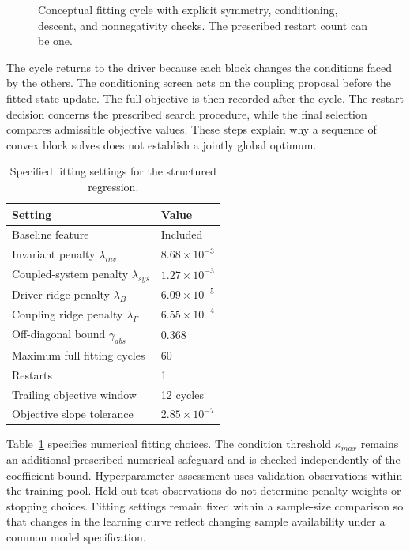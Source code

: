 \begin{figure}[htbp]
\centering

\caption{Conceptual fitting cycle with explicit symmetry, conditioning, descent, and nonnegativity checks. The prescribed restart count can be one.}
\label{fig:ch5_training_cycle}
\end{figure}

The cycle returns to the driver because each block changes the conditions faced by the others. The conditioning screen acts on the coupling proposal before the fitted-state update. The full objective is then recorded after the cycle. The restart decision concerns the prescribed search procedure, while the final selection compares admissible objective values. These steps explain why a sequence of convex block solves does not establish a jointly global optimum.

\begin{table}[htbp]
\centering
\caption{Specified fitting settings for the structured regression.}
\label{tab:icsor_fitting_settings}
\begin{tabular}{ll}
\toprule
Setting & Value\\
\midrule
Baseline feature & Included\\
Invariant penalty \(\lambda_{inv}\) & \(8.68\times10^{-3}\)\\
Coupled-system penalty \(\lambda_{sys}\) & \(1.27\times10^{-3}\)\\
Driver ridge penalty \(\lambda_B\) & \(6.09\times10^{-5}\)\\
Coupling ridge penalty \(\lambda_{\Gamma}\) & \(6.55\times10^{-4}\)\\
Off-diagonal bound \(\gamma_{abs}\) & 0.368\\
Maximum full fitting cycles & 60\\
Restarts & 1\\
Trailing objective window & 12 cycles\\
Objective slope tolerance & \(2.85\times10^{-7}\)\\
\bottomrule
\end{tabular}
\end{table}

Table~\ref{tab:icsor_fitting_settings} specifies numerical fitting choices. The condition threshold \(\kappa_{max}\) remains an additional prescribed numerical safeguard and is checked independently of the coefficient bound. Hyperparameter assessment uses validation observations within the training pool. Held-out test observations do not determine penalty weights or stopping choices. Fitting settings remain fixed within a sample-size comparison so that changes in the learning curve reflect changing sample availability under a common model specification.

